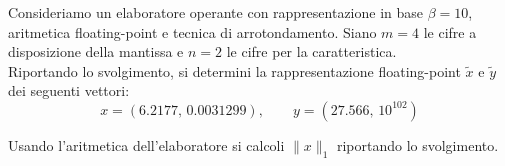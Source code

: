 Consideriamo un elaboratore operante con rappresentazione in base 
$\beta=10$, aritmetica floating-point e tecnica di 
arrotondamento. Siano $m=4$ le cifre a disposizione
della mantissa e $n=2$ le cifre per la caratteristica.\\

\noindent Riportando lo svolgimento, si determini la 
rappresentazione floating-point $\widetilde{x}$ e $\widetilde{y}$ 
dei seguenti vettori:
\[ x=(6.2177, \,  0.0031299), \quad \quad  y=(27.566, \, 10^{102}) \]

\noindent
Usando l'aritmetica dell'elaboratore si calcoli $\|x\|_1$ 
riportando lo svolgimento.


